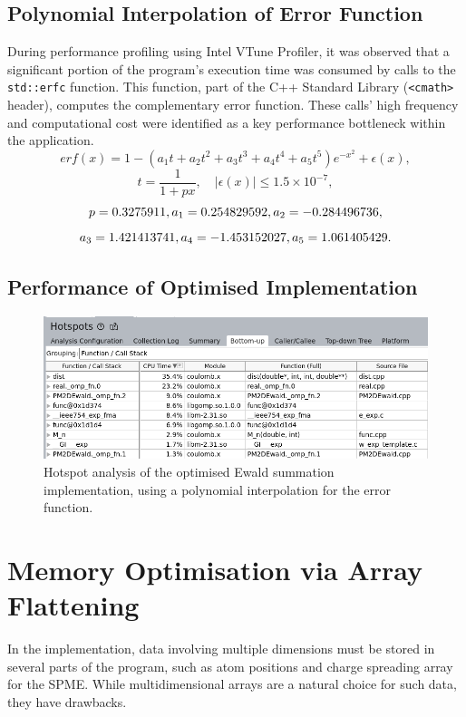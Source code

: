 \subsection{Polynomial Interpolation of Error Function}
During performance profiling using Intel VTune Profiler, it was observed that a significant portion of the program’s execution time was consumed by calls to the \verb|std::erfc| function. This function, part of the C++ Standard Library (\verb|<cmath>| header), computes the complementary error function. These calls' high frequency and computational cost were identified as a key performance bottleneck within the application.
\[
erf(x) = 1 - (a_1 t + a_2 t^2 + a_3 t^3 + a_4 t^4 + a_5 t^5) e^{-x^2} + \epsilon(x),
\]
\[
t = \frac{1}{1 + px}, \quad |\epsilon(x)| \leq 1.5 \times 10^{-7},
\]
\[
p = 0.3275911, \\
a_1 = 0.254829592, \\
a_2 = -0.284496736,
\]
\[
a_3 = 1.421413741, \\
a_4 = -1.453152027, \\
a_5 = 1.061405429.
\]
\subsection{Performance of Optimised Implementation}
\begin{figure}[htbp]
    \centering
    \includegraphics[width = \linewidth]{images/VTuneFinalHotSpots.png}
    \caption{Hotspot analysis of the optimised Ewald summation implementation, using a polynomial interpolation for the error function.}
    \label{fig:result1}
\end{figure}
\section{Memory Optimisation via Array Flattening}
In the implementation, data involving multiple dimensions must be stored in several parts of the program, such as atom positions and charge spreading array for the SPME. While multidimensional arrays are a natural choice for such data, they have drawbacks. 

